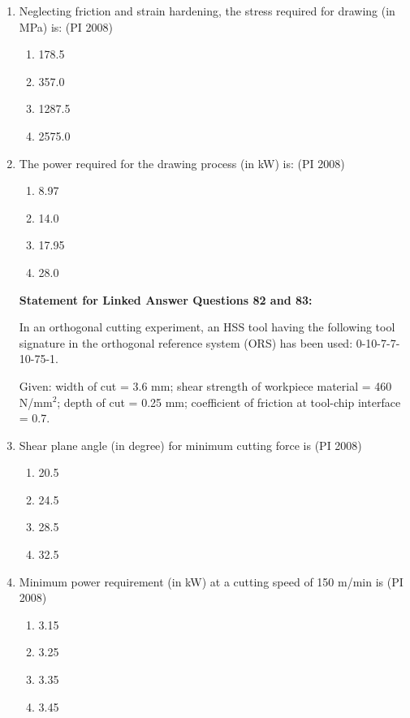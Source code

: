 \documentclass[journal,12pt,onecolumn]{IEEEtran}
\theoremstyle{remark}
\begin{document}
\begin{enumerate}
\noindent
\item %
Neglecting friction and strain hardening, the stress required for drawing (in MPa) is: \hfill{(PI 2008)}
\begin{multicols}{4}
    \begin{enumerate}
\item  178.5 
\item 357.0 
\item 1287.5 
\item 2575.0

 \end{enumerate}
\end{multicols}
\vspace{1cm}

\noindent
\item %
The power required for the drawing process (in kW) is: \hfill{(PI 2008)}
\begin{multicols}{4}
    \begin{enumerate}
\item  8.97
\item 14.0 
\item 17.95 
\item 28.0
 \end{enumerate}
\end{multicols}
\vspace{1cm}

\textbf{Statement for Linked Answer Questions 82 and 83:}

In an orthogonal cutting experiment, an HSS tool having the following tool signature in the orthogonal reference system (ORS) has been used: 0-10-7-7-10-75-1.  

Given: width of cut = 3.6 mm; shear strength of workpiece material = 460 N/mm$^2$;  
depth of cut = 0.25 mm; coefficient of friction at tool-chip interface = 0.7.  


    \item %
    Shear plane angle (in degree) for minimum cutting force is \hfill{(PI 2008)} 
    \begin{enumerate}
        \item 20.5
        \item 24.5
        \item 28.5
        \item 32.5
    \end{enumerate}

    \item %
    Minimum power requirement (in kW) at a cutting speed of 150 m/min is  \hfill{(PI 2008)}
    \begin{enumerate}
        \item 3.15
        \item 3.25
        \item 3.35
        \item 3.45
    \end{enumerate}



\end{enumerate}
\end{document}

